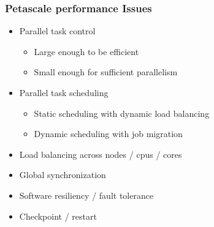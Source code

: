\begin{frame}[fragile] \frametitle{Petascale performance Issues}
   \begin{itemize}
      \item {}Parallel task control
      \begin{itemize}
          \item {}Large enough to be efficient
          \item {}Small enough for sufficient parallelism
      \end{itemize}
      \item {}Parallel task scheduling
      \begin{itemize}
          \item {}Static scheduling with dynamic load balancing
          \item {}Dynamic scheduling with job migration
      \end{itemize}
      \item {}Load balancing across nodes / cpus / cores
      \item {}Global synchronization
      \item {}Software resiliency / fault tolerance
      \item {}Checkpoint / restart
   \end{itemize}
\end{frame}

